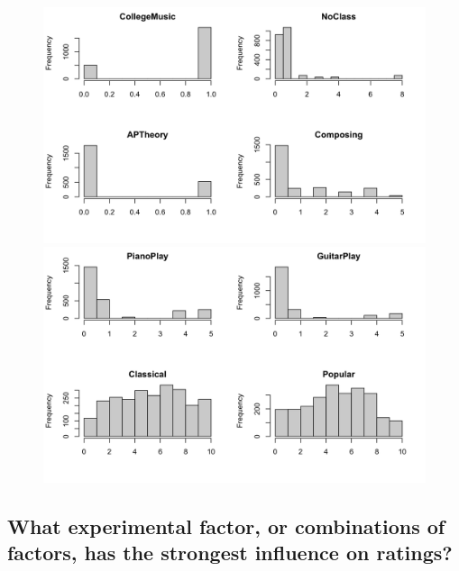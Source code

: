 \documentclass{article}
\begin{document}
\begin{figure}
\begin{minipage}[b]{0.5\linewidth}
        \vspace{4ex}
    \end{minipage}
    \begin{minipage}[b]{0.5\linewidth}
        \centering
        \includegraphics[width=\linewidth]{000027.png}
        \vspace{4ex}
    \end{minipage}
    \begin{minipage}[b]{0.5\linewidth}
        \centering
        \includegraphics[width=\linewidth]{000030.png}
        \vspace{4ex}
    \end{minipage}
\end{figure}


\subsection{What experimental factor, or combinations of factors, has the strongest influence on ratings?}
\end{document}
